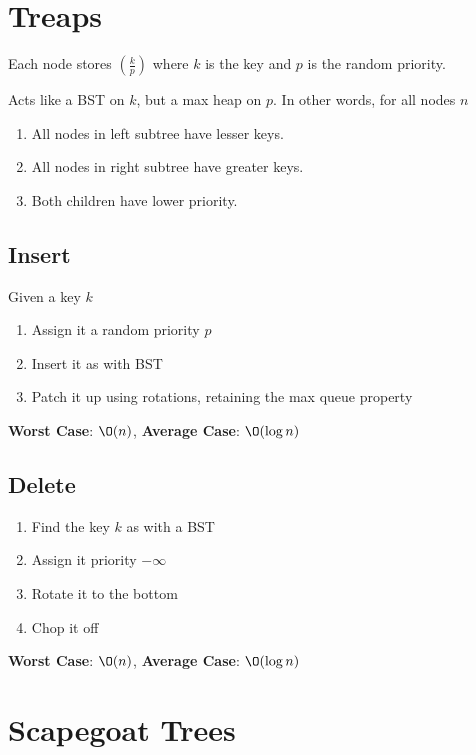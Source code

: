 \documentclass[12pt, letterpaper]{article}
\newcommand{\tr}[2]{
    \left(\frac{#1}{#2}\right)
}
\begin{document}
\begin{multicols*}{3}
        \section{Treaps}
        Each node stores $\tr{k}{p}$ where $k$ is the key and $p$ is the random priority.

        Acts like a BST on $k$, but a max heap on $p$. In other words, for all nodes $n$
        \begin{enumerate}
            \item All nodes in left subtree have lesser keys.
            \item All nodes in right subtree have greater keys.
            \item Both children have lower priority.
        \end{enumerate}
        

        \subsection{Insert}
        Given a key $k$
        \begin{enumerate}
            \item Assign it a random priority $p$
            \item Insert it as with BST
            \item Patch it up using rotations, retaining the max queue property
        \end{enumerate}

        {\bf Worst Case}: $\O(n)$, {\bf Average Case}: $\O(\log n)$

        \subsection{Delete}
        \begin{enumerate}
            \item Find the key $k$ as with a BST
            \item Assign it priority $-\infty$
            \item Rotate it to the bottom
            \item Chop it off
        \end{enumerate}

        {\bf Worst Case}: $\O(n)$, {\bf Average Case}: $\O(\log n)$


        
        \section{Scapegoat Trees}


\end{multicols*}
\end{document}

